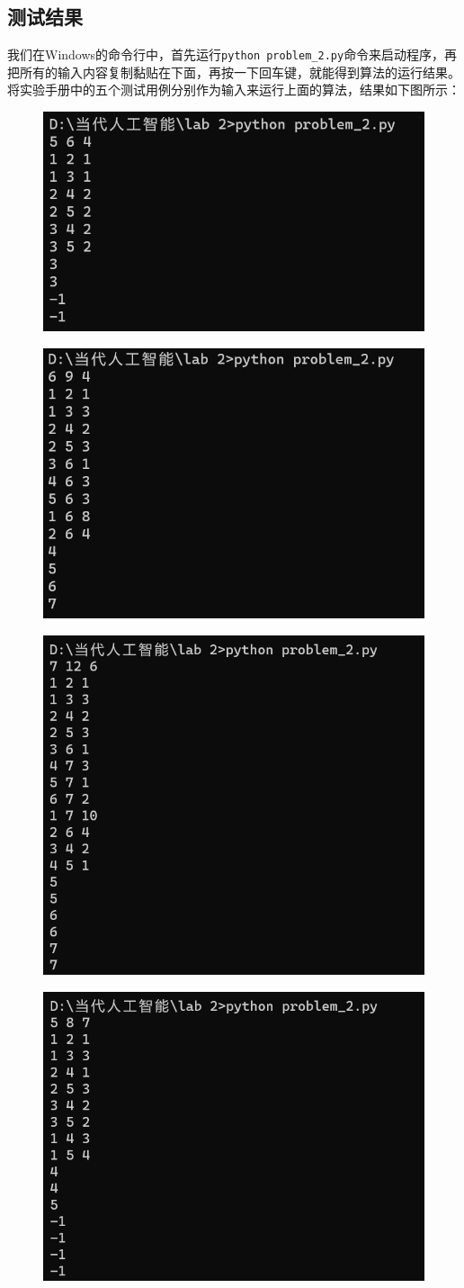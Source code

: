 \documentclass{article}
\begin{document}
\subsection{测试结果}
我们在Windows的命令行中，首先运行\lstinline|python problem_2.py|命令来启动程序，再把所有的输入内容复制黏贴在下面，再按一下回车键，就能得到算法的运行结果。将实验手册中的五个测试用例分别作为输入来运行上面的算法，结果如下图所示：
\begin{figure}[H]
    \centering
    \includegraphics[width=0.5\linewidth]{image2.png}
    \label{fig:enter-label}
\end{figure}
\begin{figure}[H]
    \centering
    \includegraphics[width=0.5\linewidth]{image3.png}
    \label{fig:enter-label}
\end{figure}
\begin{figure}[H]
    \centering
    \includegraphics[width=0.5\linewidth]{image4.png}
    \label{fig:enter-label}
\end{figure}
\begin{figure}[H]
    \centering
    \includegraphics[width=0.5\linewidth]{image5.png}
    \label{fig:enter-label}
\end{figure}
\end{document}
